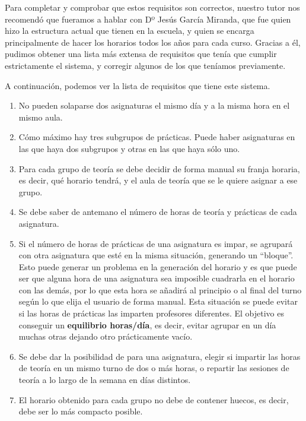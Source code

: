 Para completar y comprobar que estos requisitos son correctos, nuestro tutor nos recomendó que fueramos a hablar con Dº Jesús García Miranda, que fue quien hizo la estructura actual que tienen en la escuela, y quien se encarga principalmente de hacer los horarios todos los años para cada curso. Gracias a él, pudimos obtener una lista más extensa de requisitos que tenía que cumplir estrictamente el sistema, y corregir algunos de los que teníamos previamente. 

A continuación, podemos ver la lista de requisitos que tiene este sistema.

\begin{enumerate}[REQ-1]
    \item No pueden solaparse dos asignaturas el mismo día y a la misma hora en el mismo aula.
    \item Cómo máximo hay tres subgrupos de prácticas. Puede haber asignaturas en las que haya dos subgrupos y otras en las que haya sólo uno.
    \item Para cada grupo de teoría se debe decidir de forma manual su franja horaria, es decir, qué horario tendrá, y el aula de teoría que se le quiere asignar a ese grupo.
    \item Se debe saber de antemano el número de horas de teoría y prácticas de cada asignatura.
    \item Si el número de horas de prácticas de una asignatura es impar, se agrupará con otra asignatura que esté en la misma situación, generando un ``bloque''. Esto puede generar un problema en la generación del horario y es que puede ser que alguna hora de una asignatura sea imposible cuadrarla en el horario con las demás, por lo que esta hora se añadirá al principio o al final del turno según lo que elija el usuario de forma manual. Esta situación se puede evitar si las horas de prácticas las imparten profesores diferentes. El objetivo es conseguir un \textbf{equilibrio horas/día}, es decir, evitar agrupar en un día muchas otras dejando otro prácticamente vacío. 
    \item Se debe dar la posibilidad de para una asignatura, elegir si impartir las horas de teoría en un mismo turno de dos o más horas, o repartir las sesiones de teoría a lo largo de la semana en días distintos.
    \item El horario obtenido para cada grupo no debe de contener huecos, es decir, debe ser lo más compacto posible.

\end{enumerate}
